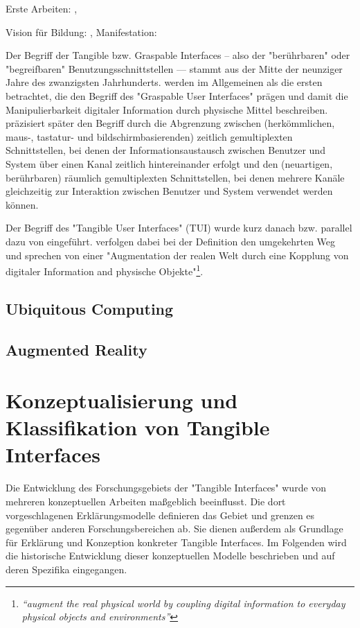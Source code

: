 Erste Arbeiten: \citep{Wellner93a}, \citep{Suzuki95}

Vision für Bildung: \citep{Resnick98}, Manifestation: \citep{Zuckerman05}

Der Begriff der Tangible bzw. Graspable Interfaces – also der "berührbaren" oder "begreifbaren" Benutzungsschnittstellen — stammt aus der Mitte der neunziger Jahre des zwanzigsten Jahrhunderts. \citet{Fitzmaurice95} werden im Allgemeinen als die ersten betrachtet, die den Begriff des "Graspable User Interfaces" prägen und damit die Manipulierbarkeit digitaler Information durch physische Mittel beschreiben. \citet{Fitzmaurice96} präzisiert später den Begriff durch die Abgrenzung zwischen (herkömmlichen, maus-, tastatur- und bildschirmbasierenden) zeitlich gemultiplexten Schnittstellen, bei denen der Informationsaustausch zwischen Benutzer und System über einen Kanal zeitlich hintereinander erfolgt und den (neuartigen, berührbaren) räumlich gemultiplexten Schnittstellen, bei denen mehrere Kanäle gleichzeitig zur Interaktion zwischen Benutzer und System verwendet werden können. 

Der Begriff des "Tangible User Interfaces" (TUI) wurde kurz danach bzw. parallel dazu von \citet{Ishii97} eingeführt. \citeauthor{Ishii97} verfolgen dabei bei der Definition den umgekehrten Weg und sprechen von einer "Augmentation der realen Welt durch eine Kopplung von digitaler Information and physische Objekte"\footnote{\emph{“augment the real physical world by coupling digital information to everyday physical objects and environments”}\citep{Ishii97}}. 

\subsection{Ubiquitous Computing}

\subsection{Augmented Reality} 


\section{Konzeptualisierung und Klassifikation von Tangible Interfaces} %
\label{sec:konzeptualisierungen_von_tangible_interfaces}

Die Entwicklung des Forschungsgebiets der "Tangible Interfaces" wurde von mehreren konzeptuellen Arbeiten maßgeblich beeinflusst. Die dort vorgeschlagenen Erklärungsmodelle definieren das Gebiet und grenzen es gegenüber anderen Forschungsbereichen ab. Sie dienen außerdem als Grundlage für Erklärung und Konzeption konkreter Tangible Interfaces. Im Folgenden wird die historische Entwicklung dieser konzeptuellen Modelle beschrieben und auf deren Spezifika eingegangen.

